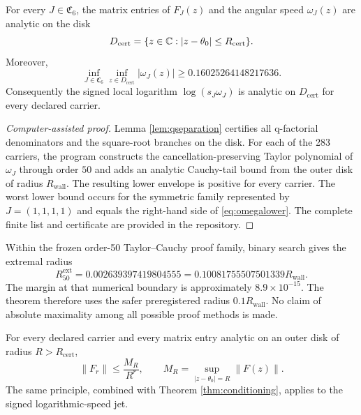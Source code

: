 \begin{theorem}
\label{thm:conditioning}
For every $J\in\mathfrak C_6$, the matrix entries of $F_J(z)$ and the angular speed $\omega_J(z)$ are analytic on the disk
\[
D_{\mathrm{cert}}=\{z\in\mathbb C:|z-\theta_0|\le R_{\mathrm{cert}}\}.
\]
Moreover,
\begin{equation}
\inf_{J\in\mathfrak C_6}
\inf_{z\in D_{\mathrm{cert}}}
|\omega_J(z)|
\ge0.16025264148217636.
\label{eq:omegalower}
\end{equation}
Consequently the signed local logarithm $\log(s_J\omega_J)$ is analytic on $D_{\mathrm{cert}}$ for every declared carrier.
\end{theorem}

\begin{proof}[Computer-assisted proof]
Lemma \ref{lem:qseparation} certifies all q-factorial denominators and the square-root branches on the disk.  For each of the 283 carriers, the program constructs the cancellation-preserving Taylor polynomial of $\omega_J$ through order $50$ and adds an analytic Cauchy-tail bound from the outer disk of radius $R_{\mathrm{wall}}$.  The resulting lower envelope is positive for every carrier.  The worst lower bound occurs for the symmetric family represented by $J=(1,1,1,1)$ and equals the right-hand side of \eqref{eq:omegalower}.  The complete finite list and certificate are provided in the repository.
\end{proof}

\begin{remark}
Within the frozen order-50 Taylor--Cauchy proof family, binary search gives the extremal radius
\[
R_{50}^{\mathrm{ext}}=0.002639397419804555
=0.10081755507501339R_{\mathrm{wall}}.
\]
The margin at that numerical boundary is approximately $8.9\times10^{-15}$.  The theorem therefore uses the safer preregistered radius $0.1R_{\mathrm{wall}}$.  No claim of absolute maximality among all possible proof methods is made.
\end{remark}

\begin{corollary}
\label{cor:cauchy}
For every declared carrier and every matrix entry analytic on an outer disk of radius $R>R_{\mathrm{cert}}$,
\begin{equation}
\|F_r\|\le \frac{M_R}{R^r},
\qquad
M_R=\sup_{|z-\theta_0|=R}\|F(z)\|.
\label{eq:cauchybound}
\end{equation}
The same principle, combined with Theorem \ref{thm:conditioning}, applies to the signed logarithmic-speed jet.
\end{corollary}
